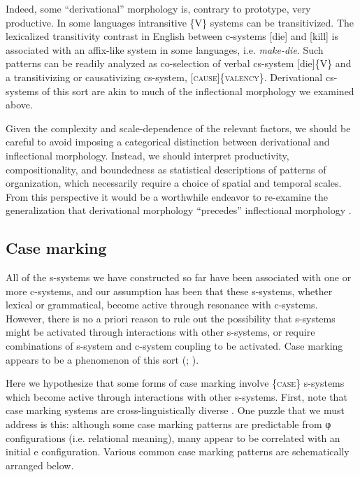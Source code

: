   Indeed, some “derivational” morphology is, contrary to prototype, very productive. In some languages intransitive \{V\} systems can be transitivized. The lexicalized transitivity contrast in English between c-systems [die] and [kill] is associated with an affix-like system in some languages, i.e. \textit{make-die}. Such patterns can be readily analyzed as co-selection of verbal cs-system [die]\{V\} and a transitivizing or causativizing cs-system, [\textsc{cause}]\{\textsc{valency}\}. Derivational cs-systems of this sort are akin to much of the inflectional morphology we examined above. 

  Given the complexity and scale-dependence of the relevant factors, we should be careful to avoid imposing a categorical distinction between derivational and inflectional morphology. Instead, we should interpret productivity, compositionality, and boundedness as statistical descriptions of patterns of organization, which necessarily require a choice of spatial and temporal scales. From this perspective it would be a worthwhile endeavor to re-examine the generalization that derivational morphology “precedes” inflectional morphology \citep{Booij1996}.

\subsection{Case marking}

All of the s-systems we have constructed so far have been associated with one or more c-systems, and our assumption has been that these s-systems, whether lexical or grammatical, become active through resonance with c-systems. However, there is no a priori reason to rule out the possibility that s-systems might be activated through interactions with other s-systems, or require combinations of s-system and c-system coupling to be activated. Case marking appears to be a phenomenon of this sort (\citealt{BobaljikWurmbrand2008}; \citealt{MalchukovSpencer2008}).

  Here we hypothesize that some forms of case marking involve \{\textsc{case}\} s-systems which become active through interactions with other s-systems. First, note that case marking systems are cross-linguistically diverse \citep{MalchukovSpencer2008}. One puzzle that we must address is this: although some case marking patterns are predictable from φ configurations (i.e. relational meaning), many appear to be correlated with an initial e configuration. Various common case marking patterns are schematically arranged below. 

